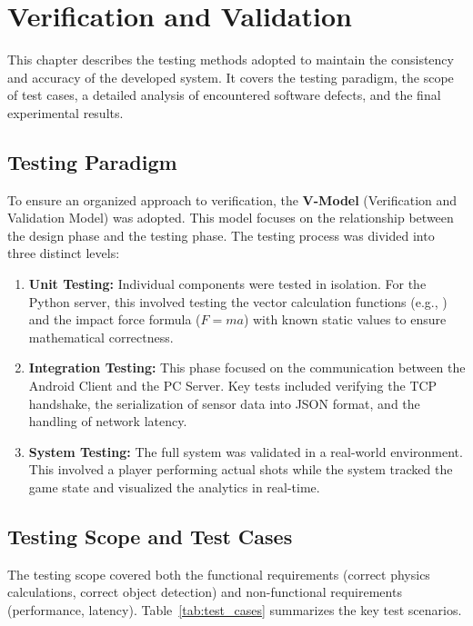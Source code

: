 \chapter{Verification and Validation}

This chapter describes the testing methods adopted to maintain the consistency and accuracy of the developed system. It covers the testing paradigm, the scope of test cases, a detailed analysis of encountered software defects, and the final experimental results.

\section{Testing Paradigm}
To ensure an organized approach to verification, the \textbf{V-Model} (Verification and Validation Model) was adopted. This model focuses on the relationship between the design phase and the testing phase. The testing process was divided into three distinct levels:

\begin{enumerate}
    \item \textbf{Unit Testing:} Individual components were tested in isolation. For the Python server, this involved testing the vector calculation functions (e.g., ) and the impact force formula ($F=ma$) with known static values to ensure mathematical correctness.
    \item \textbf{Integration Testing:} This phase focused on the communication between the Android Client and the PC Server. Key tests included verifying the TCP handshake, the serialization of sensor data into JSON format, and the handling of network latency.
    \item \textbf{System Testing:} The full system was validated in a real-world environment. This involved a player performing actual shots while the system tracked the game state and visualized the analytics in real-time.
\end{enumerate}

\section{Testing Scope and Test Cases}
The testing scope covered both the functional requirements (correct physics calculations, correct object detection) and non-functional requirements (performance, latency). Table~\ref{tab:test_cases} summarizes the key test scenarios.

